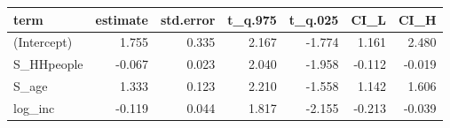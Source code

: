 \begin{tabular}{lrrrrrr}
  \hline
term & estimate & std.error & t\_q.975 & t\_q.025 & CI\_L & CI\_H \\ 
  \hline
(Intercept) & 1.755 & 0.335 & 2.167 & -1.774 & 1.161 & 2.480 \\ 
  S\_HHpeople & -0.067 & 0.023 & 2.040 & -1.958 & -0.112 & -0.019 \\ 
  S\_age & 1.333 & 0.123 & 2.210 & -1.558 & 1.142 & 1.606 \\ 
  log\_inc & -0.119 & 0.044 & 1.817 & -2.155 & -0.213 & -0.039 \\ 
   \hline
\end{tabular}
